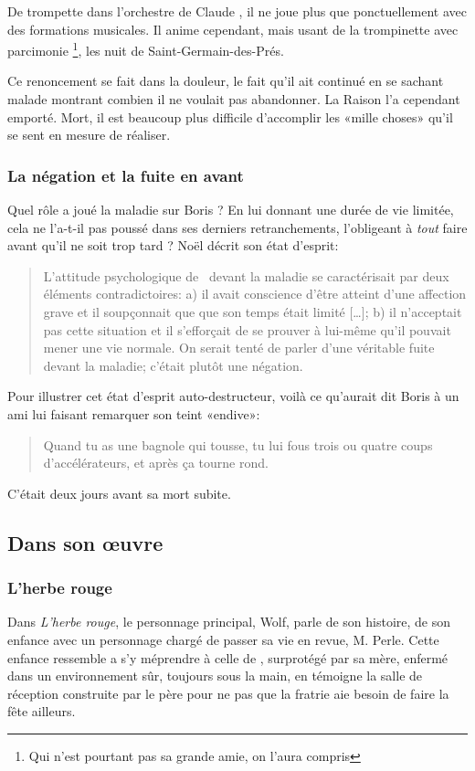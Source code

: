 De trompette dans l'orchestre de Claude , il ne joue plus que ponctuellement avec des
formations musicales. Il anime cependant, mais usant de la trompinette avec parcimonie
\footnote{Qui n'est pourtant pas sa grande amie, on l'aura compris}, les nuit de Saint-Germain-des-Prés.

Ce renoncement se fait dans la douleur, le fait qu'il ait continué en se sachant malade montrant
combien il ne voulait pas abandonner. La Raison l'a cependant emporté. Mort, il est beaucoup
plus difficile d'accomplir les «mille choses» qu'il se sent en mesure de réaliser.

\subsubsection{La négation et la fuite en avant}

Quel rôle a joué la maladie sur Boris ? En lui donnant une durée de vie limitée, cela
ne l'a-t-il pas poussé dans ses derniers retranchements, l'obligeant à \emph{tout} faire
avant qu'il ne soit trop tard ? Noël  décrit son état d'esprit:
\begin{quotation}
L'attitude psychologique de \BV\ devant la maladie se caractérisait par deux éléments
contradictoires: a) il avait conscience d'être atteint d'une affection grave et il soupçonnait que
que son temps était limité [\ldots]; b) il n'acceptait pas cette situation et il s'efforçait de se
prouver à lui-même qu'il pouvait mener une vie normale. On serait tenté de parler d'une
véritable fuite devant la maladie; c'était plutôt une négation.
\end{quotation}

Pour illustrer cet état d'esprit auto-destructeur, voilà ce qu'aurait dit
Boris à un ami lui faisant remarquer son teint «endive»:
\begin{quotation}
Quand tu as une bagnole qui tousse, tu lui fous trois ou quatre coups d'accélérateurs,
et après ça tourne rond.
\end{quotation}
C'était deux jours avant sa mort subite.


\subsection{Dans son \oe{}uvre}

\subsubsection{L'herbe rouge}
Dans \emph{L'herbe rouge}, le personnage principal, Wolf, parle de son histoire, de son enfance
avec un personnage chargé de passer sa vie en revue, M. Perle.
Cette enfance ressemble a s'y méprendre à celle de \BV, surprotégé
par sa mère, enfermé dans un environnement sûr, toujours sous la main, en témoigne la
salle de réception construite par le père pour ne pas que la fratrie aie besoin de faire
la fête ailleurs.

